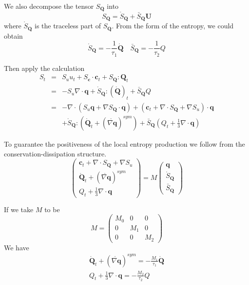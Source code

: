 \documentclass[a4paper]{article}
\begin{document}
We also decompose the tensor $S_{\mathbf{Q}}$ into 
\begin{equation}
S_{\mathbf{Q}}=\mathring{S}_\mathbf{Q}+\bar{S}_\mathbf{Q}\mathbf{U} 
\end{equation}
where $\mathring{S}_{\mathbf{Q}}$ is the traceless part of $S_{\mathbf{Q}}$.
From the form of the entropy, we could obtain
\begin{equation}
\mathring{S}_{\mathbf{Q}}=-\frac{1}{\tau_1}\mathring{\mathbf{Q}} \quad \bar{S}_{\mathbf{Q}}=-\frac{1}{\tau_2} Q
\end{equation}

Then apply the calculation
\begin{eqnarray}
S_t &=& S_u u_t +S_{\mathbf{c}} \cdot \mathbf{c}_t + S_{\mathbf{Q}}:\mathbf{Q}_t \\
    &=& -S_u \nabla \cdot \mathbf{q} + \mathring{S}_{\mathbf{Q}}:(\mathring{\mathbf{Q}})_t+\bar{S}_{\mathbf{Q}}Q \\
    &=& -\nabla \cdot (S_u \mathbf{q}+\nabla S_\mathbf{Q} \cdot \mathbf{q})+(\mathbf{c}_t+\nabla \cdot S_{\mathbf{Q}}+\nabla S_u) \cdot \mathbf{q} \\
&& +\mathring{S}_{\mathbf{Q}}:(\mathring{\mathbf{Q}}_t+(\mathring{\nabla \mathbf{q}})^{sym})+\bar{S}_{\mathbf{Q}}(Q_t+\frac{1}{3}\nabla \cdot \mathbf{q})
\end{eqnarray}

To guarantee the positiveness of the local entropy production we follow from the conservation-dissipation structure.
\begin{equation}
\left( \begin{array}{ll} \mathbf{c}_t+\nabla \cdot S_{\mathbf{Q}}+\nabla S_u \\ \mathring{\mathbf{Q}}_t+(\mathring{\nabla \mathbf{q}})^{sym} \\ Q_t+\frac{1}{3} \nabla \cdot \mathbf{q} \end{array} \right) = M \left( \begin{array}{l} \mathbf{q} \\ \mathring{S}_{\mathbf{Q}} \\\bar{S}_{\mathbf{Q}} \end{array} \right) 
\end{equation}

If we take $M$ to be 
\begin{equation}
M=\left( \begin{array}{lll} M_0 & 0 & 0 \\0 & M_1 & 0 \\0 & 0 & M_2 \end{array} \right)
\end{equation}
We have
\begin{eqnarray}
\mathring{\mathbf{Q}}_t+(\mathring{\nabla \mathbf{q}})^{sym}=-\frac{M_1}{\tau_1}\mathring{\mathbf{Q}} \\
Q_t+\frac{1}{3} \nabla \cdot \mathbf{q}=-\frac{M_2}{\tau_2}Q
\end{eqnarray}
\end{document}
